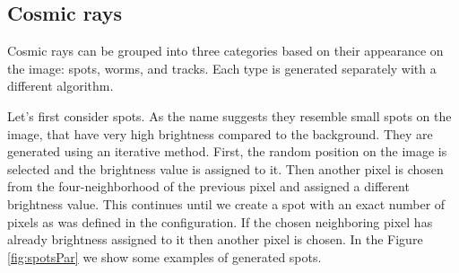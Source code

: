 \subsection{Cosmic rays}
Cosmic rays can be grouped into three categories based on their appearance on the image: spots, worms, and tracks. Each type is generated separately with a different algorithm. 

Let's first consider spots. As the name suggests they resemble small spots on the image, that have very high brightness compared to the background. They are generated using an iterative method. First, the random position on the image is selected and the brightness value is assigned to it. Then another pixel is chosen from the four-neighborhood of the previous pixel and assigned a different brightness value. This continues until we create a spot with an exact number of pixels as was defined in the configuration. If the chosen neighboring pixel has already brightness assigned to it then another pixel is chosen. In the Figure \ref{fig:spotsPar} we show some examples of generated spots. 

